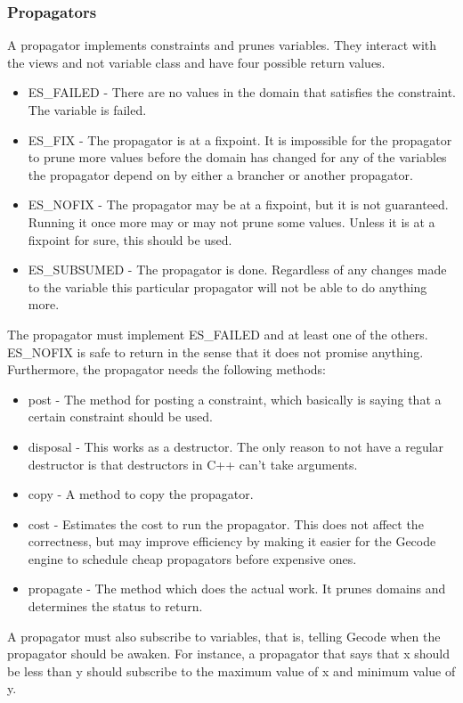 \documentclass[a4paper,11pt]{article}
\begin{document}
\subsubsection{Propagators}
A propagator implements constraints and prunes variables. They interact with the views and not variable class and have four possible return values.
\begin{itemize}
\item{ES\_FAILED} - There are no values in the domain that satisfies the constraint. The variable is failed.
\item{ES\_FIX} - The propagator is at a fixpoint. It is impossible for the propagator to prune more values before the domain has changed for any of the variables the propagator depend on by either a brancher or another propagator.
\item{ES\_NOFIX} - The propagator may be at a fixpoint, but it is not guaranteed. Running it once more may or may not prune some values. Unless it is at a fixpoint for sure, this should be used.
\item{ES\_SUBSUMED} - The propagator is done. Regardless of any changes made to the variable this particular propagator will not be able to do anything more.
\end{itemize}
The propagator must implement ES\_FAILED and at least one of the others. ES\_NOFIX is safe to return in the sense that it does not promise anything. Furthermore, the propagator needs the following methods:
\begin{itemize}
\item{post} - The method for posting a constraint, which basically is saying that a certain constraint should be used.
\item{disposal} - This works as a destructor. The only reason to not have a regular destructor is that destructors in C++ can't take arguments.
\item{copy} - A method to copy the propagator.
\item{cost} - Estimates the cost to run the propagator. This does not affect the correctness, but may improve efficiency by making it easier for the Gecode engine to schedule cheap propagators before expensive ones.
\item{propagate} - The method which does the actual work. It prunes domains and determines the status to return.
\end{itemize}
A propagator must also subscribe to variables, that is, telling Gecode when the propagator should be awaken. For instance, a propagator that says that x should be less than y should subscribe to the maximum value of x and minimum value of y.
\end{document}
